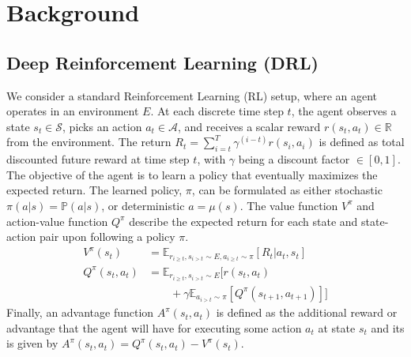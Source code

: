 \documentclass[../thesis.tex]{subfiles}
\begin{document}

\section{Background}
\subsection{Deep Reinforcement Learning (DRL)}


We consider a standard Reinforcement Learning (RL) setup, where an agent operates in an environment ${E}$. At each discrete time step $t$, the agent observes a state $s_t \in \mathcal{S}$, picks an action $a_t \in \mathcal{A}$, and receives a scalar reward $r(s_t, a_t) \in \mathbb{R}$ from the environment. The return $R_t = \sum^T_{i=t} \gamma^{(i-t)}r(s_i,a_i)$ is defined as total discounted future reward at time step $t$, with $\gamma$ being a discount factor $\in [0,1]$. The objective of the agent is to learn a policy that eventually maximizes the expected return.
The learned policy, $\pi$, can be formulated as either stochastic $\pi(a|s) = \mathbb{P}(a|s)$, or deterministic $a = \mu(s)$. The value function $V^{\pi}$ and action-value function $Q^{\pi}$ describe the expected return for each state and state-action pair upon following a policy $\pi$. \begin{align}
V^\pi(s_t) &= \mathbb{E}_{r_{i \geq t}, s_{i > t} \sim E, a_{i \geq t} \sim \pi} [R_t | a_t, s_t] \\
Q^\pi(s_t, a_t) &= \mathbb{E}_{r_{i \geq t}, s_{i > t} \sim E} [r(s_t, a_t) \nonumber \\
&\qquad + \gamma \mathbb{E}_{a_{i > t} \sim \pi} [Q^\pi(s_{t+1}, a_{t+1})]]
\end{align}
Finally, an advantage function $A^{\pi}(s_t,a_t)$ is defined as the additional reward or advantage that the agent will have for executing some action $a_t$ at state $s_t$ and its is given by $A^{\pi}(s_t,a_t) = Q^\pi(s_t, a_t) - V^\pi(s_t)$. 
\end{document}
